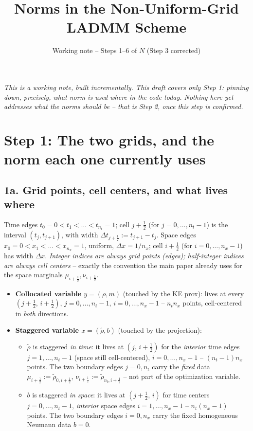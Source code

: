\documentclass[11pt]{article}
\title{Norms in the Non-Uniform-Grid LADMM Scheme}
\author{Working note -- Steps 1--6 of \(N\) (Step 3 corrected)}
\date{}
\newcommand{\dt}{\Delta t}
\newcommand{\dx}{\Delta x}
\newcommand{\half}{\tfrac12}
\begin{document}
\maketitle

\emph{This is a working note, built incrementally. This draft covers only Step 1: pinning down,
precisely, what norm is used \emph{where} in the code today. Nothing here yet addresses what the
norms \emph{should} be -- that is Step 2, once this step is confirmed.}

\section*{Step 1: The two grids, and the norm each one currently uses}

\subsection*{1a. Grid points, cell centers, and what lives where}

Time edges $t_0=0<t_1<\dots<t_{n_t}=1$; cell $j+\half$ (for $j=0,\dots,n_t-1$) is the interval
$(t_j,t_{j+1})$, with width $\dt_{j+\half}:=t_{j+1}-t_j$. Space edges
$x_0=0<x_1<\dots<x_{n_x}=1$, uniform, $\dx=1/n_x$; cell $i+\half$ (for $i=0,\dots,n_x-1$) has width
$\dx$. \emph{Integer indices are always grid points (edges); half-integer indices are always cell
centers} -- exactly the convention the main paper already uses for the space marginals
$\mu_{i+\half},\nu_{i+\half}$.

\begin{itemize}
\item \textbf{Collocated variable $y=(\rho,m)$} (touched by the KE prox): lives at every
  $(j+\half,\,i+\half)$, $j=0,\dots,n_t-1$, $i=0,\dots,n_x-1$ -- $n_t n_x$ points, cell-centered in
  \emph{both} directions.
\item \textbf{Staggered variable $x=(\tilde\rho,b)$} (touched by the projection):
  \begin{itemize}
  \item $\tilde\rho$ is staggered \emph{in time}: it lives at $(j,\,i+\half)$ for the
    \emph{interior} time edges $j=1,\dots,n_t-1$ (space still cell-centered), $i=0,\dots,n_x-1$ --
    $(n_t-1)n_x$ points. The two boundary edges $j=0,n_t$ carry the \emph{fixed} data
    $\mu_{i+\half}:=\tilde\rho_{0,i+\half}$, $\nu_{i+\half}:=\tilde\rho_{n_t,i+\half}$ -- not part
    of the optimization variable.
  \item $b$ is staggered \emph{in space}: it lives at $(j+\half,\,i)$ for time centers
    $j=0,\dots,n_t-1$, \emph{interior} space edges $i=1,\dots,n_x-1$ -- $n_t(n_x-1)$ points. The
    two boundary edges $i=0,n_x$ carry the fixed homogeneous Neumann data $b=0$.
  \end{itemize}
\end{itemize}
\end{document}
